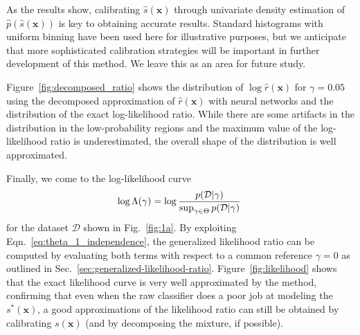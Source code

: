 \documentclass[12pt]{article}
\numberwithin{equation}{section}
\theoremstyle{plain}
\begin{document}
As the results show, calibrating $\hat s(\mathbf{x})$ through univariate density estimation of
$\hat p(\hat s(\mathbf{x}))$ is key to obtaining accurate results. Standard
histograms with uniform binning have been used here for illustrative purposes, but we
anticipate that more sophisticated calibration strategies will be important in further development
of this method. We leave this as an area for future study.

Figure~\ref{fig:decomposed_ratio} shows the distribution of $ \log \hat r(\mathbf{x})$ for $\gamma=0.05$
using the decomposed approximation of $\hat r(\mathbf{x})$ with neural networks and the distribution
of the exact log-likelihood ratio. While there are some artifacts in the distribution in the low-probability regions and the maximum value of the log-likelihood ratio is underestimated, the overall shape of the distribution is well approximated.

Finally, we come to the log-likelihood curve
\begin{equation}
\log \Lambda( \gamma ) =  \log \frac{ p({\cal D} | \gamma ) }{ \sup_{\gamma \in \Theta} p({\cal D} | \gamma )} \;
\end{equation}
for the dataset $\mathcal{D}$ shown in  Fig.~\ref{fig:1a}.
By exploiting Eqn.~\ref{eq:theta_1_independence},
the generalized likelihood ratio can be computed by evaluating
both terms with respect to a common reference $\gamma=0$
as outlined in Sec.~\ref{sec:generalized-likelihood-ratio}.
Figure~\ref{fig:likelihood} shows that the exact likelihood curve is very well
approximated by the method, confirming that
even when the raw classifier does a poor job at modeling the $s^*(\mathbf{x})$, a good approximations of the
likelihood ratio can still be obtained by calibrating $s(\mathbf{x})$ (and by decomposing
the mixture, if possible).
\end{document}
